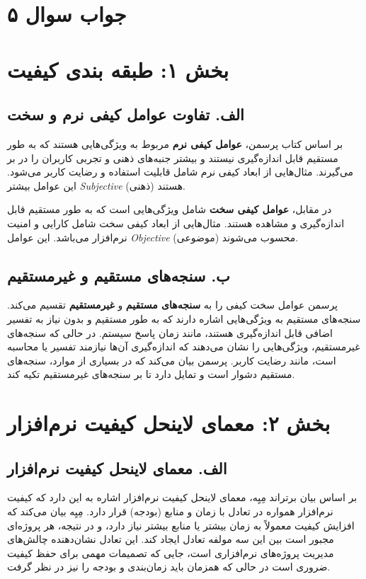 \section*{جواب سوال ۵}

\section*{بخش ۱: طبقه بندی کیفیت}

\subsection*{الف. تفاوت عوامل کیفی نرم و سخت}

بر اساس کتاب پرسمن، \textbf{عوامل کیفی نرم} مربوط به ویژگی‌هایی هستند که به طور مستقیم قابل اندازه‌گیری نیستند و بیشتر جنبه‌های ذهنی و تجربی کاربران را در بر می‌گیرند. مثال‌هایی از ابعاد کیفی نرم شامل قابلیت استفاده و رضایت کاربر می‌شود. این عوامل بیشتر \textit{Subjective} (ذهنی) هستند.

در مقابل، \textbf{عوامل کیفی سخت} شامل ویژگی‌هایی است که به طور مستقیم قابل اندازه‌گیری و مشاهده هستند. مثال‌هایی از ابعاد کیفی سخت شامل کارایی و امنیت نرم‌افزار می‌باشد. این عوامل \textit{Objective} (موضوعی) محسوب می‌شوند.

\subsection*{ب. سنجه‌های مستقیم و غیرمستقیم}

پرسمن عوامل سخت کیفی را به \textbf{سنجه‌های مستقیم} و \textbf{غیرمستقیم} تقسیم می‌کند. سنجه‌های مستقیم به ویژگی‌هایی اشاره دارند که به طور مستقیم و بدون نیاز به تفسیر اضافی قابل اندازه‌گیری هستند، مانند زمان پاسخ سیستم. در حالی که سنجه‌های غیرمستقیم، ویژگی‌هایی را نشان می‌دهند که اندازه‌گیری آن‌ها نیازمند تفسیر یا محاسبه است، مانند رضایت کاربر. پرسمن بیان می‌کند که در بسیاری از موارد، سنجه‌های مستقیم دشوار است و تمایل دارد تا بر سنجه‌های غیرمستقیم تکیه کند.

\section*{بخش ۲: معمای لاینحل کیفیت نرم‌افزار}

\subsection*{الف. معمای لاینحل کیفیت نرم‌افزار}

بر اساس بیان برتراند مِیِه، معمای لاینحل کیفیت نرم‌افزار اشاره به این دارد که کیفیت نرم‌افزار همواره در تعادل با زمان و منابع (بودجه) قرار دارد. مِیِه بیان می‌کند که افزایش کیفیت معمولاً به زمان بیشتر یا منابع بیشتر نیاز دارد، و در نتیجه، هر پروژه‌ای مجبور است بین این سه مولفه تعادل ایجاد کند. این تعادل نشان‌دهنده چالش‌های مدیریت پروژه‌های نرم‌افزاری است، جایی که تصمیمات مهمی برای حفظ کیفیت ضروری است در حالی که همزمان باید زمان‌بندی و بودجه را نیز در نظر گرفت.

